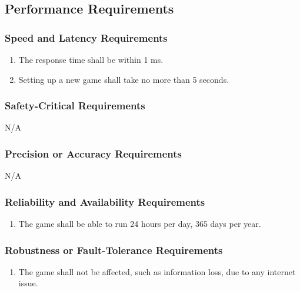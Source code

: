 \documentclass[12pt, titlepage]{article}
\begin{document}
\subsection{Performance Requirements}
\label{sub:performance_requirements}

\subsubsection{Speed and Latency Requirements}
\label{ssub:speed_and_latency_requirements}
\begin{enumerate}[{PR}1. ]
        \item The response time shall be within 1 ms.
        \item Setting up a new game shall take no more than 5 seconds.
\end{enumerate}

\subsubsection{Safety-Critical Requirements}
\label{ssub:safety_critical_requirements}
N/A

\subsubsection{Precision or Accuracy Requirements}
\label{ssub:precision_or_accuracy_requirements}
N/A

\subsubsection{Reliability and Availability Requirements}
\label{ssub:reliability_and_availability_requirements}
\begin{enumerate}[start=3,label={ PR\arabic*.}]
        \item The game shall be able to run 24 hours per day, 365 days per year.
\end{enumerate}

\subsubsection{Robustness or Fault-Tolerance Requirements}
\label{ssub:robustness_or_fault_tolerance_requirements}
\begin{enumerate}[start=4,label={ PR\arabic*.}]
        \item The game shall not be affected, such as information loss, due to any internet issue.
\end{enumerate}
\end{document}
